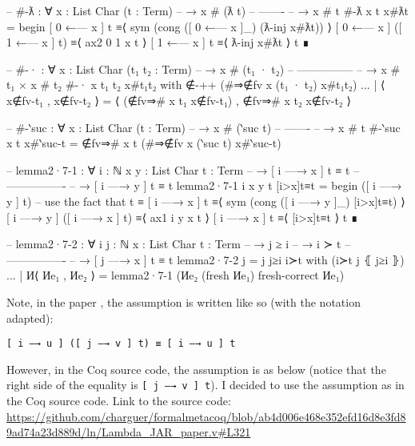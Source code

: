 \documentclass[logo,bsc,singlespacing,parskip,online]{infthesis}
\renewenvironment{code}{\mintedcopy[breaklines,breaksymbolleft=\;]{agda}}{\endmintedcopy}
\begin{document}
\begin{code}
-- #-ƛ : ∀ {x : List Char} (t : Term)
--   → x # (ƛ t)
--     -------
--   → x # t
#-ƛ {x} t x#ƛt =
  begin
    [ 0 ←— x ] t
  ≡⟨ sym (cong ([ 0 ←— x ]_) (ƛ-inj x#ƛt)) ⟩
    [ 0 ←— x ] ([ 1 ←— x ] t)
  ≡⟨ ax2 0 1 x t ⟩
    [ 1 ←— x ] t
  ≡⟨ ƛ-inj x#ƛt ⟩
    t
  ∎

-- #-· : ∀ {x : List Char} (t₁ t₂ : Term)
--   → x # (t₁ · t₂)
--     ---------------
--   → x # t₁ × x # t₂
#-· {x} t₁ t₂ x#t₁t₂ with ∉-++ (#⇒∉fv x (t₁ · t₂) x#t₁t₂)
... | ⟨ x∉fv-t₁ , x∉fv-t₂ ⟩
  = ⟨ (∉fv⇒# x t₁ x∉fv-t₁) , ∉fv⇒# x t₂ x∉fv-t₂ ⟩

-- #-‵suc : ∀ {x : List Char} (t : Term)
--   → x # (‵suc t)
--     -------
--   → x # t
#-‵suc {x} t x#‵suc-t = ∉fv⇒# x t (#⇒∉fv x (‵suc t) x#‵suc-t)


-- lemma2·7-1 : ∀ {i : ℕ} {x y : List Char} {t : Term}
--   → [ i —→ x ] t ≡ t
--     ----------------
--   → [ i —→ y ] t ≡ t
lemma2·7-1 {i} {x} {y} {t} [i>x]t≡t =
  begin
    ([ i —→ y ] t)
  -- use the fact that t ≡ [ i —→ x ] t
  ≡⟨ sym (cong ([ i —→ y ]_) [i>x]t≡t) ⟩
    [ i —→ y ] ([ i —→ x ] t)
  ≡⟨ ax1 i y x t ⟩
    [ i —→ x ] t
  ≡⟨ [i>x]t≡t ⟩
    t
  ∎

-- lemma2·7-2 : ∀ {i j : ℕ} {x : List Char} {t : Term}
--   → j ≥ i
--   → i ≻ t
--     ----------------
--   → [ j —→ x ] t ≡ t
lemma2·7-2 {j = j} j≥i i≻t with (i≻t j ⦃ j≥i ⦄)
... | И⟨ Иe₁ , Иe₂ ⟩ =
  lemma2·7-1 (Иe₂ (fresh Иe₁) {fresh-correct Иe₁})
\end{code}

Note, in the paper \citep{chargueraud_locally_2012}, the assumption is written like so (with the
notation adapted):

\texttt{[ i —→ u ] ([ j —→ v ] t) ≡ [ i —→ u ] t}

However, in the Coq source code, the assumption is as below (notice that the right side of the
equality is \texttt{[ j —→ v ] t}). I decided to use the assumption as in the Coq source code. Link
to the source code:
\url{https://github.com/charguer/formalmetacoq/blob/ab4d006e468e352efd16d8e3fd89ad74a23d889d/ln/Lambda_JAR_paper.v#L321}
\end{document}
